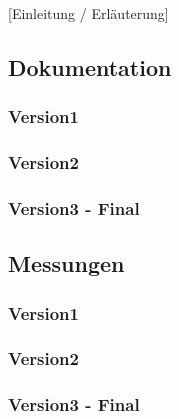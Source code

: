 [Einleitung / Erläuterung]
\subsection{Dokumentation}
\subsubsection{Version1}
\subsubsection{Version2}
\subsubsection{Version3 - Final}

\subsection{Messungen}
\subsubsection{Version1}
\subsubsection{Version2}
\subsubsection{Version3 - Final}